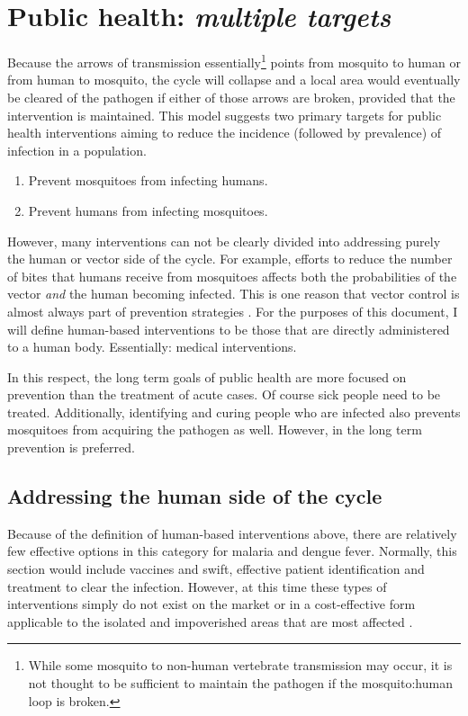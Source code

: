 \section{Public health: \emph{multiple targets}}

Because the arrows of transmission essentially\footnote{While some mosquito
  to non-human vertebrate transmission may occur, it is not thought to
  be sufficient to maintain the pathogen if the mosquito:human loop is
  broken.}
points from mosquito to human or from human to mosquito, the cycle will collapse and a local area would eventually be cleared of the pathogen if either of those arrows are broken, provided that the intervention is maintained.
This model suggests two primary targets for public health interventions aiming to reduce the \gls{incidence}
(followed by \gls{prevalence}) of infection in a population.

\begin{enumerate}
\item Prevent mosquitoes from infecting humans.
\item Prevent humans from infecting mosquitoes.
\end{enumerate}

However, many interventions can not be clearly divided into addressing purely the human or vector side of the cycle.
For example, efforts to reduce the number of bites that humans receive from mosquitoes affects both the probabilities of the vector \emph{and} the human becoming infected.
This is one reason that vector control is almost always part of prevention strategies \CITEME.
For the purposes of this document, I will define human-based interventions to be those that are directly administered to a human body.
Essentially: medical interventions.

In this respect, the long term goals of public health are more focused on prevention than the treatment of acute cases.
Of course sick people need to be treated. Additionally, identifying and curing people who are infected also prevents mosquitoes from acquiring the pathogen as well.
However, in the long term prevention is preferred.


\subsection{Addressing the human side of the cycle}

Because of the definition of human-based interventions above, there are relatively few effective options in this category for malaria and dengue fever.
Normally, this section would include vaccines and swift, effective patient identification and treatment to clear the infection.
However, at this time these types of interventions simply do not exist on the market or in a cost-effective form applicable to the isolated and impoverished areas that are most affected \CITEME.

